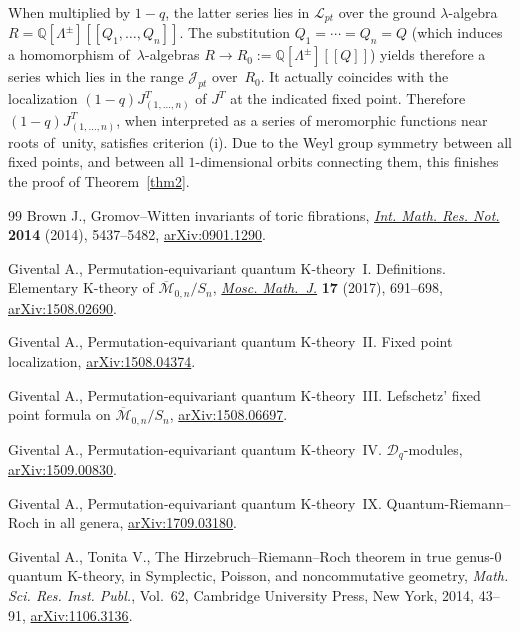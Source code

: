 \documentclass[11pt]{article}
\numberwithin{equation}{section}
\numberwithin{equation}{section}
\def\J{\mathcal J}
\def\L{\mathcal L}
\def\QQ{\mathbb Q}
\begin{document}
When multiplied by $1-q$, the latter series lies in $\L_{pt}$ over the ground $\lambda$-algebra $R=\QQ[\Lambda^{\pm}][[Q_1,\dots,Q_n]]$. The substitution $Q_1=\cdots=Q_n=Q$ (which induces a homomorphism of~$\lambda$-algebras $R\to R_0:=\QQ[\Lambda^{\pm}][[Q]]$) yields therefore a series which lies in the range $\J_{pt}$ over~$R_0$. It actually coincides with the localization $(1-q) J^T_{(1,\dots,n)}$ of $J^T$ at the indicated fixed point. Therefore $(1-q) J^T_{(1,\dots,n)}$, when interpreted as a series of meromorphic functions near roots of~unity, satisfies criterion (i). Due to the Weyl group symmetry between all fixed points, and between all $1$-dimensional orbits connecting them, this finishes the proof of Theorem~\ref{thm2}.


\begin{thebibliography}{99}
Brown J., Gromov--{W}itten invariants of toric fibrations, \href{https://doi.org/10.1093/imrn/rnt030}{\textit{Int. Math.
 Res. Not.}} \textbf{2014} (2014), 5437--5482, \href{https://arxiv.org/abs/0901.1290}{arXiv:0901.1290}.

Givental A., Permutation-equivariant quantum {K}-theory~{I}. {D}efinitions.
 {E}lementary {K}-theory of {$\overline{\mathcal M}_{0,n}/S_n$}, \href{https://doi.org/10.17323/1609-4514-2016-16-4-691-698}{\textit{Mosc.
 Math.~J.}} \textbf{17} (2017), 691--698, \href{https://arxiv.org/abs/1508.02690}{arXiv:1508.02690}.

Givental A., Permutation-equivariant quantum {K}-theory~{II}. Fixed point
 localization, \href{https://arxiv.org/abs/1508.04374}{arXiv:1508.04374}.

Givental A., Permutation-equivariant quantum {K}-theory~{III}. {L}efschetz'
 fixed point formula on {${\overline{\mathcal M}}_{0,n}/S_n$},
 \href{https://arxiv.org/abs/1508.06697}{arXiv:1508.06697}.

Givental A., Permutation-equivariant quantum {K}-theory~{IV}. {${\mathcal
 D}_q$}-modules, \href{https://arxiv.org/abs/1509.00830}{arXiv:1509.00830}.

Givental A., Permutation-equivariant quantum {K}-theory~{IX}.
 {Q}uantum-{R}iemann--{R}och in all genera, \href{https://arxiv.org/abs/1709.03180}{arXiv:1709.03180}.

Givental A., Tonita V., The {H}irzebruch--{R}iemann--{R}och theorem in true
 genus-0 quantum {K}-theory, in Symplectic, {P}oisson, and noncommutative
 geometry, \textit{Math. Sci. Res. Inst. Publ.}, Vol.~62, Cambridge University
 Press, New York, 2014, 43--91, \href{https://arxiv.org/abs/1106.3136}{arXiv:1106.3136}.


\end{thebibliography}
\end{document}
